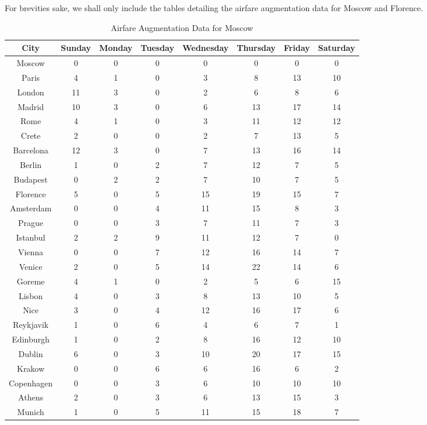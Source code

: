 \documentclass[12pt]{article}
\begin{document}
For brevities sake, we shall only include the tables detailing the airfare augmentation data for Moscow and Florence.

\begin{table}[h]
\caption{Airfare Augmentation Data for Moscow}
\centering
\vspace{1mm}
\begin{tabular}{c|c|c|c|c|c|c|c}
\hline
\rule{0pt}{2ex} City & Sunday & Monday & Tuesday & Wednesday & Thursday & Friday & Saturday \\
\hline
\rule{0pt}{2ex}Moscow & 0 & 0 & 0 & 0 & 0 & 0 & 0 \\
Paris & 4 & 1 & 0 & 3 & 8 & 13 & 10 \\
London & 11 & 3 & 0 & 2 & 6 & 8 & 6 \\
Madrid & 10 & 3 & 0 & 6 & 13 & 17 & 14 \\
Rome & 4 & 1 & 0 & 3 & 11 & 12 & 12 \\
Crete & 2 & 0 & 0 & 2 & 7 & 13 & 5 \\
Barcelona & 12 & 3 & 0 & 7 & 13 & 16 & 14 \\
Berlin & 1 & 0 & 2 & 7 & 12 & 7 & 5 \\
Budapest & 0 & 2 & 2 & 7 & 10 & 7 & 5 \\
Florence & 5 & 0 & 5 & 15 & 19 & 15 & 7 \\
Amsterdam & 0 & 0 & 4 & 11 & 15 & 8 & 3 \\
Prague & 0 & 0 & 3 & 7 & 11 & 7 & 3 \\
Istanbul & 2 & 2 & 9 & 11 & 12 & 7 & 0 \\
Vienna & 0 & 0 & 7 & 12 & 16 & 14 & 7 \\
Venice & 2 & 0 & 5 & 14 & 22 & 14 & 6 \\
Goreme & 4 & 1 & 0 & 2 & 5 & 6 & 15 \\
Lisbon & 4 & 0 & 3 & 8 & 13 & 10 & 5 \\
Nice & 3 & 0 & 4 & 12 & 16 & 17 & 6 \\
Reykjavik & 1 & 0 & 6 & 4 & 6 & 7 & 1 \\
Edinburgh & 1 & 0 & 2 & 8 & 16 & 12 & 10 \\
Dublin & 6 & 0 & 3 & 10 & 20 & 17 & 15 \\
Krakow & 0 & 0 & 6 & 6 & 16 & 6 & 2 \\
Copenhagen & 0 & 0 & 3 & 6 & 10 & 10 & 10 \\
Athens & 2 & 0 & 3 & 6 & 13 & 15 & 3 \\
Munich & 1 & 0 & 5 & 11 & 15 & 18 & 7 \\
\end{tabular}
\end{table}
\end{document}
